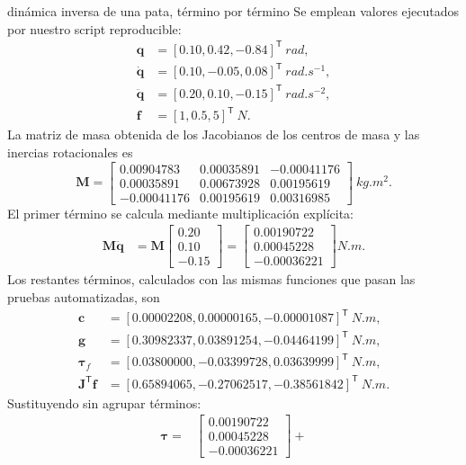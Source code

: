 \documentclass[11pt,letterpaper]{article}
\newcommand{\vect}[1]{\bm{#1}}
\newcommand{\mat}[1]{\bm{#1}}
\newcommand{\trans}{^{\mathsf T}}
\begin{document}
\begin{workedexample}{dinámica inversa de una pata, término por término}
Se emplean valores ejecutados por nuestro script reproducible:
\begin{align*}
 \vect q&=[0.10,0.42,-0.84]\trans\ \si{rad},\\
 \dot{\vect q}&=[0.10,-0.05,0.08]\trans\ \si{rad.s^{-1}},\\
 \ddot{\vect q}&=[0.20,0.10,-0.15]\trans\ \si{rad.s^{-2}},\\
 \vect f&=[1,0.5,5]\trans\ \si{N}.
\end{align*}
La matriz de masa obtenida de los Jacobianos de los centros de masa y las
inercias rotacionales es
\[
\mat M=\begin{bmatrix}
0.00904783&0.00035891&-0.00041176\\
0.00035891&0.00673928&0.00195619\\
-0.00041176&0.00195619&0.00316985
\end{bmatrix}\ \si{kg.m^2}.
\]
El primer término se calcula mediante multiplicación explícita:
\begin{align*}
 \mat M\ddot{\vect q}
 &=\mat M\begin{bmatrix}0.20\\0.10\\-0.15\end{bmatrix}
 =\begin{bmatrix}0.00190722\\0.00045228\\-0.00036221\end{bmatrix}\si{N.m}.
\end{align*}
Los restantes términos, calculados con las mismas funciones que pasan las
pruebas automatizadas, son
\begin{align*}
 \vect c&=[0.00002208,0.00000165,-0.00001087]\trans\ \si{N.m},\\
 \vect g&=[0.30982337,0.03891254,-0.04464199]\trans\ \si{N.m},\\
 \vect\tau_f&=[0.03800000,-0.03399728,0.03639999]\trans\ \si{N.m},\\
 \mat J\trans\vect f&=[0.65894065,-0.27062517,-0.38561842]\trans\ \si{N.m}.
\end{align*}
Sustituyendo sin agrupar términos:
\begin{align*}
 \vect\tau={}&
 \begin{bmatrix}0.00190722\\0.00045228\\-0.00036221\end{bmatrix}+

\end{align*}
\end{workedexample}
\end{document}
